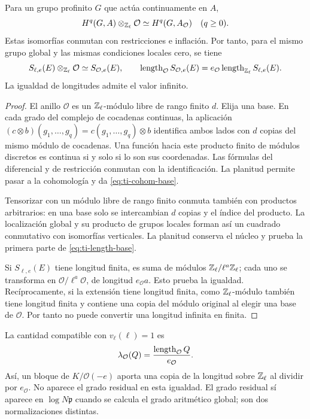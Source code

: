 \begin{proposicion}
\label{prop:ti-escalares}
Para un grupo profinito $G$ que actúa continuamente en $A$,
\begin{equation}
 H^q(G,A)\otimes_{\mathbb{Z}_\ell}\mathcal O
 \simeq H^q(G,A_{\mathcal O})\quad(q\ge0).
 \label{eq:ti-cohom-base}
\end{equation}
Estas isomorfías conmutan con restricciones e inflación.
Por tanto, para el mismo grupo global y las mismas condiciones
locales cero, se tiene
\begin{equation}
 S_{\ell,e}(E)\otimes_{\mathbb{Z}_\ell}\mathcal O
 \simeq S_{\mathcal O,e}(E),\qquad
 \operatorname{length}_{\mathcal O}S_{\mathcal O,e}(E)
 =e_{\mathcal O}\operatorname{length}_{\mathbb{Z}_\ell}S_{\ell,e}(E).
 \label{eq:ti-length-base}
\end{equation}
La igualdad de longitudes admite el valor infinito.
\end{proposicion}
\begin{proof}
El anillo $\mathcal O$ es un $\mathbb{Z}_\ell$-módulo libre de rango
finito $d$. Elija una base. En cada grado del complejo de
cocadenas continuas, la aplicación
$(c\otimes b)(g_1,\ldots,g_q)=c(g_1,\ldots,g_q)\otimes b$
identifica ambos lados con $d$ copias del mismo módulo de
cocadenas. Una función hacia este producto finito de módulos
discretos es continua si y solo si lo son sus coordenadas.
Las fórmulas del diferencial y de restricción conmutan con la
identificación. La planitud permite pasar a la cohomología y
da \eqref{eq:ti-cohom-base}.

Tensorizar con un módulo libre de rango finito conmuta también
con productos arbitrarios: en una base solo se intercambian
$d$ copias y el índice del producto. La localización global
y su producto de grupos locales forman así un cuadrado
conmutativo con isomorfías verticales. La planitud conserva
el núcleo y prueba la primera parte de \eqref{eq:ti-length-base}.

Si $S_{\ell,e}(E)$ tiene longitud finita, es suma de módulos
$\mathbb{Z}_\ell/\ell^{a}\mathbb{Z}_\ell$; cada uno se transforma en
$\mathcal O/\ell^a\mathcal O$, de longitud $e_{\mathcal O}a$.
Esto prueba la igualdad. Recíprocamente, si la extensión tiene
longitud finita, como $\mathbb{Z}_\ell$-módulo también tiene longitud
finita y contiene una copia del módulo original al elegir una
base de $\mathcal O$. Por tanto no puede convertir una longitud
infinita en finita.
\end{proof}

La cantidad compatible con $v_\ell(\ell)=1$ es
\begin{equation}
 \lambda_{\mathcal O}(Q)=\frac{\operatorname{length}_{\mathcal O}Q}{e_{\mathcal O}}.
 \label{eq:ti-normalizacion}
\end{equation}
Así, un bloque de $K/\mathcal O(-e)$ aporta una copia de la
longitud sobre $\mathbb{Z}_\ell$ al dividir por $e_{\mathcal O}$.
No aparece el grado residual en esta igualdad. El grado residual
sí aparece en $\log N\mathfrak p$ cuando se calcula el grado
aritmético global; son dos normalizaciones distintas.

